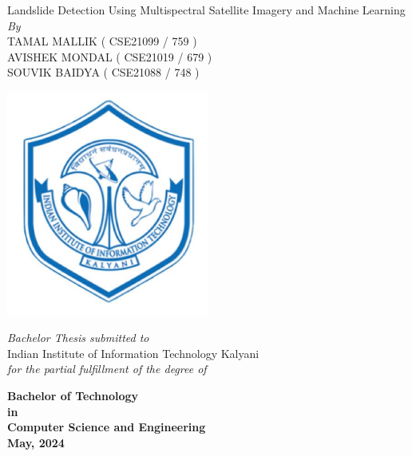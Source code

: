 \documentclass[12pt,a4paper]{report}
\newcommand{\mytitle}{Landslide Detection Using Multispectral Satellite Imagery and Machine Learning}
\newcommand{\mySpace}{0.6cm}
\newcommand{\mySpaceHalf}{0.5cm}
\begin{document}
\clearpage
	\begin{titlepage}

    \centering
    {\Huge \mytitle \fontsize{24}{28.8}\selectfont {}\selectfont}\\
\vspace{\mySpace}
    \large \textit{By}\\
\vspace{\mySpace}
    {\Large TAMAL MALLIK ( CSE21099 / 759 ) \\
    \vspace{0.1cm}
    AVISHEK MONDAL ( CSE21019 / 679 ) \\
    \vspace{0.1cm}
    SOUVIK BAIDYA ( CSE21088  / 748 ) \\
    \fontsize{18}{22}\selectfont {}\selectfont
\vspace{\mySpace}}
    \begin{center}
        \includegraphics[width=0.5\textwidth]{iiitk_logo} %
    \end{center}
    {\Large \textit{Bachelor Thesis submitted to}\\
    \vspace{\mySpaceHalf}
    Indian Institute of Information Technology Kalyani \\ \vspace{\mySpaceHalf}
	 \textit{for the partial fulfillment of the degree of}\\ \vspace{\mySpaceHalf}

{\bfseries %
	 Bachelor of Technology \\ 
	 in \\
	 Computer Science and Engineering\\ \vspace{\mySpaceHalf}
	  May, 2024 \fontsize{18}{22}}\selectfont {}\selectfont}
    \vspace*{\fill}
\end{titlepage}
\restoregeometry
\end{document}
